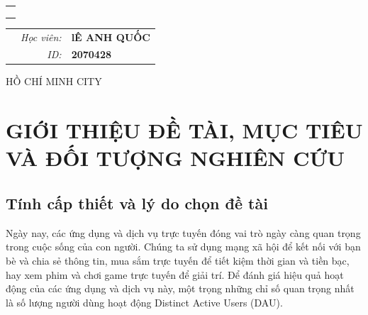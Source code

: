 \documentclass[a4paper,13pt]{article}
\theoremstyle{mytheor}
\begin{document}
\begin{titlepage}
\begin{center}
\begin{tabular}{c}
\\
\\

\\
\\

\end{tabular}
\end{center}

\vspace{1cm}

\begin{table}[h]
\begin{tabular}{rrl}
\hspace{5.6cm} 
&\textit{Học viên: } & \textbf{lÊ ANH QUỐC}\\
&\textit{ID: } & \textbf{2070428}\\

\end{tabular}
\end{table}
\vspace{1cm}
\begin{center}
{\footnotesize HỒ CHÍ MINH CITY}
\end{center}
\end{titlepage}




\renewcommand{\contentsname}{Content}
\newpage
\vspace{1cm}
\tableofcontents
\newpage
\section{GIỚI THIỆU ĐỀ TÀI, MỤC TIÊU VÀ ĐỐI TƯỢNG NGHIÊN CỨU}
\subsection{Tính cấp thiết và lý do chọn đề tài}
\hspace{2em}Ngày nay, các ứng dụng và dịch vụ trực tuyến đóng vai trò ngày càng quan trọng trong cuộc sống của con người. 
Chúng ta sử dụng mạng xã hội để kết nối với bạn bè và chia sẻ thông tin, mua sắm trực tuyến để tiết kiệm thời gian và tiền bạc, 
hay xem phim và chơi game trực tuyến để giải trí. Để đánh giá hiệu quả hoạt động của các ứng dụng và dịch vụ này, 
một trọng những chỉ số quan trọng nhất là số lượng người dùng hoạt động Distinct Active Users (DAU).
\end{document}
